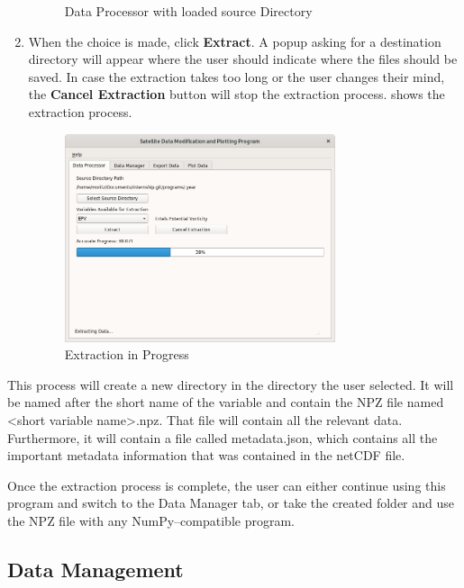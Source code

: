 \documentclass[../00_main.tex]{subfiles}
\begin{document}
\begin{enumerate}
\begin{figure}[H]
            \caption{Data Processor with loaded source Directory}
            \label{dp03}
        \end{figure}
    \item When the choice is made, click \textbf{Extract}. A popup asking
        for a destination directory will appear where the user should
        indicate where the files should be saved. In case the extraction
        takes too long or the user changes their mind, the \textbf{Cancel
        Extraction} button will stop the extraction process. 
        shows the extraction process.
        \begin{figure}[H]
            \center
            \includegraphics[width=0.75\textwidth]{../graphics/dp04}
            \caption{Extraction in Progress}
            \label{dp04}
        \end{figure}
\end{enumerate}
This process will create a new directory in the directory the user selected.
It will be named after the short name of the variable and contain the NPZ file 
named <short variable name>.npz. That file will contain all the relevant data. 
Furthermore, it will contain a file called metadata.json, which contains all 
the important metadata information that was contained in the netCDF file.
\newline

Once the extraction process is complete, the user can either continue using
this program and switch to the Data Manager tab, or take the created folder and
use the NPZ file with any NumPy--compatible program.

\subsection{Data Management}
\end{document}
